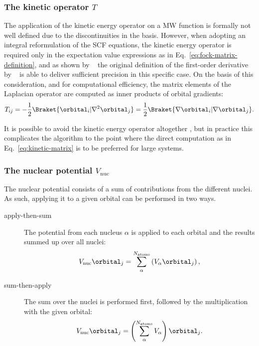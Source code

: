 \subsubsection{The kinetic operator $T$}
\label{sec:compute-T}
The application of the kinetic energy operator on a \ac{MW} function is formally not well defined due to the discontinuities in the basis.\cite{Anderson2019-bx} However, when adopting an integral reformulation of the \ac{SCF} equations, the kinetic energy operator is required only in the  expectation value expressions as in Eq.~\eqref{eq:fock-matrix-definition}, and as shown by \citeauthor{Anderson2019-bx}~\cite{Anderson2019-bx} the original definition of the first-order derivative by \citeauthor{Alpert:2002cx}~\cite{Alpert:2002cx} is able to deliver sufficient precision in this specific case. On the basis of this consideration, and for computational efficiency, the matrix elements of the Laplacian operator are computed as inner products of orbital gradients:
\begin{equation}
  \label{eq:kinetic-matrix}
  T_{ij} = 
  -\frac{1}{2} 
  \Braket{\orbital_i | \nabla^2 \orbital_j} 
  = 
  \frac{1}{2} 
  \Braket{\nabla \orbital_i | \nabla \orbital_j}.
\end{equation}

It is possible to avoid the kinetic energy operator altogether \cite{Jensen:2022gg}, but in practice this complicates the algorithm to the point where the direct computation as in Eq.~\eqref{eq:kinetic-matrix} is to be preferred for large systems.

\subsubsection{The nuclear potential $V_{\mathrm{nuc}}$}
\label{sec:compute-V}
The nuclear potential consists of a sum of contributions from the different nuclei. As such, applying it to a given orbital can be performed in two ways.

\begin{description}
\item[apply-then-sum] The potential from each nucleus $\alpha$ is applied to each orbital and the results summed up over all nuclei:
\begin{equation}
  V_{\mathrm{nuc}} \orbital_j = \sum_{\alpha}^{N_{\mathrm{atoms}}} \left(V_{\alpha} \orbital_j\right),
\end{equation} 
\item[sum-then-apply] The sum over the nuclei is performed first, followed by the multiplication with the given orbital:
\begin{equation}
V_{\mathrm{nuc}} \orbital_j = \left(\sum_{\alpha}^{N_{\mathrm{atoms}}} V_{\alpha}\right) \orbital_j.
\end{equation}
\end{description}

